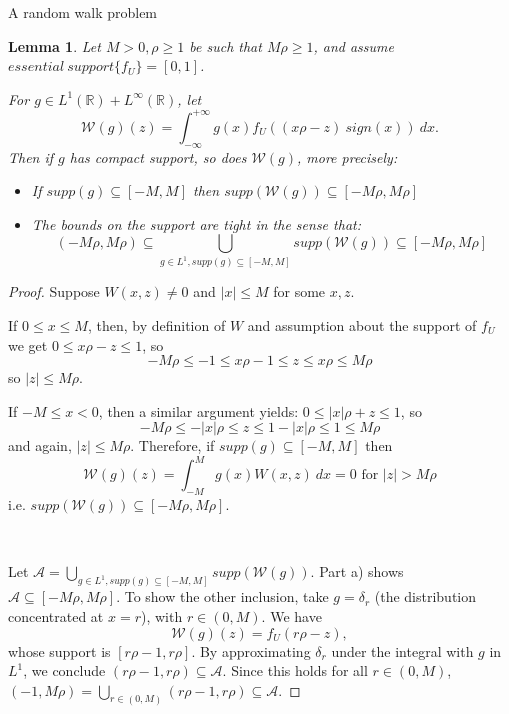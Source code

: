 \documentclass[12pt]{article}
\newtheorem*{lmm}{Lemma}
\begin{document}
\begin{section}{A random walk problem}
\begin{lmm}{} Let $M>0,\rho \ge 1$ be such that $M \rho \ge 1$, and assume  $essential \ support \{ f_U \} = [0,1]$.  
	
	For $g \in L^1(\mathbb{R}) + L^{\infty}(\mathbb{R})$, let 
$$
\mathcal{W}(g)(z)=\int_{-\infty}^{+\infty} g(x) f_U\!\left(  \left(x \rho - z \right)\ sign(x) \right) \ dx .
$$
Then if $g$ has compact support, so does $\mathcal{W}(g)$, more precisely:
\begin{itemize}
	\item[a)] If $supp(g) \subseteq [-M,M]$ then $supp(\mathcal{W}(g)) \subseteq [-M \rho,M \rho]$  
	\item[b)] The bounds on the support are tight in the sense that: 
	$$
	\left(-M \rho, M \rho \right) \subseteq \bigcup_{g \in L^1 , supp(g) \subseteq [-M,M]} supp(\mathcal{W}(g))  \subseteq  
	\left[-M \rho, M \rho \right]
	$$
\end{itemize}
\end{lmm} 

\begin{proof} Suppose $W(x,z) \ne 0$ and $|x| \le M$ for some $x, z$.  
	
	If $0 \le x \le M$, then, by definition of $W$ and assumption about the support of $f_U$ we get $0 \le x \rho - z \le 1$, so 
\begin{equation*}
-M \rho \le -1 \le x \rho - 1 \le z \le x \rho \le M \rho
\end{equation*}
so $|z| \le M \rho$. 

If  $ - M \le x < 0$, then a similar argument yields: $0 \le |x| \rho + z \le 1$, so 
\begin{equation*}
-M \rho \le - |x| \rho  \le z \le 1 - |x| \rho \le 1 \le M \rho
\end{equation*}
and again, $|z| \le M \rho$. Therefore, if $supp(g) \subseteq [-M,M]$ then 
$$
\mathcal{W}(g)(z) = \int_{-M}^{M} g(x) W(x,z) \ dx = 0 \text{ for $|z| > M \rho$}
$$ i.e. $supp(\mathcal{W}(g)) \subseteq [-M \rho, M \rho]$.  

\  

Let $ \mathcal{A} = \bigcup_{g \in L^1 , supp(g) \subseteq [-M,M]} supp(\mathcal{W}(g)) $. Part a) shows $\mathcal{A}  \subseteq [-M \rho,M \rho] $. To show the other inclusion, take $g = \delta_r$ (the distribution concentrated at $x=r$), with $r \in (0,M)$. We have 
$$
\mathcal{W}(g)(z) = f_U(r \rho -z) ,
$$
whose support is $[r \rho-1,r \rho]$. By approximating $\delta_r$ under the integral with $g$ in $L^1$, we conclude $(r \rho-1,r \rho) \subseteq \mathcal{A}$. Since this holds for all $r \in (0,M)$, $(-1,M \rho) = \bigcup_{r \in (0,M)} (r \rho-1,r \rho) \subseteq \mathcal{A}$.  


\end{proof}
\end{section}
\end{document}
